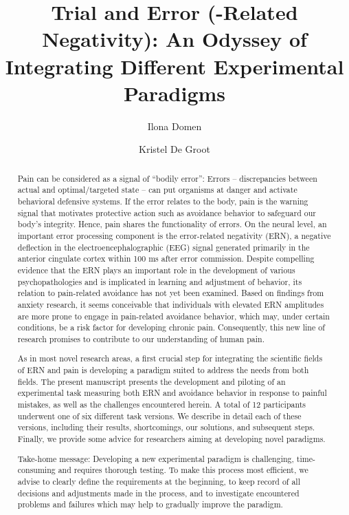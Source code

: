 \documentclass[twocolumn, serif, authordate, review]{jote-article}
\title{Trial and Error (-Related Negativity): An Odyssey of Integrating Different Experimental Paradigms}
\author[1]{Ilona Domen}
\author[2]{Kristel De Groot}
\affil[1]{Reviewer 1}
\affil[2]{Reviewer 2}
\begin{document}
\begin{frontmatter}
\maketitle
\begin{abstract}
Pain can be considered as a signal of ``bodily error'': Errors -- discrepancies between actual and optimal/targeted state -- can put organisms at danger and activate behavioral defensive systems. If the error relates to the body, pain is the warning signal that motivates protective action such as avoidance behavior to safeguard our body's integrity. Hence, pain shares the functionality of errors. On the neural level, an important error processing component is the error-related negativity (ERN), a negative deflection in the electroencephalographic (EEG) signal generated primarily in the anterior cingulate cortex within 100 ms after error commission. Despite compelling evidence that the ERN plays an important role in the development of various psychopathologies and is implicated in learning and adjustment of behavior, its relation to pain-related avoidance has not yet been examined. Based on findings from anxiety research, it seems conceivable that individuals with elevated ERN amplitudes are more prone to engage in pain-related avoidance behavior, which may, under certain conditions, be a risk factor for developing chronic pain. Consequently, this new line of research promises to contribute to our understanding of human pain.

As in most novel research areas, a first crucial step for integrating the scientific fields of ERN and pain is developing a paradigm suited to address the needs from both fields. The present manuscript presents the development and piloting of an experimental task measuring both ERN and avoidance behavior in response to painful mistakes, as well as the challenges encountered herein. A total of 12 participants underwent one of six different task versions. We describe in detail each of these versions, including their results, shortcomings, our solutions, and subsequent steps. Finally, we provide some advice for researchers aiming at developing novel paradigms.

Take-home message: Developing a new experimental paradigm is challenging, time-consuming and requires thorough testing. To make this process most efficient, we advise to clearly define the requirements at the beginning, to keep record of all decisions and adjustments made in the process, and to investigate encountered problems and failures which may help to gradually improve the paradigm.

\end{abstract}
\end{frontmatter}
\end{document}
